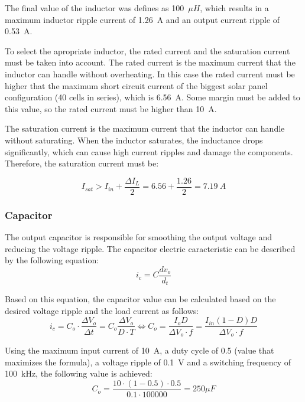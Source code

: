 The final value of the inductor was defines as 100~$\mu H$, which results in a maximum inductor ripple current of 1.26~A and an output current ripple of 0.53~A.

To select the apropriate inductor, the rated current and the saturation current must be taken into account. The rated current is the maximum current that the inductor can handle without overheating. In this case the rated current must be higher that the maximum short circuit current of the biggest solar panel configuration (40 cells in series), which is 6.56~A. Some margin must be added to this value, so the rated current must be higher than 10~A.

The saturation current is the maximum current that the inductor can handle without saturating. When the inductor saturates, the inductance drops significantly, which can cause high current ripples and damage the components. Therefore, the saturation current must be:

\begin{equation}
    I_{sat} > I_{in} + \frac{\Delta I_L}{2} = 6.56 + \frac{1.26}{2} = 7.19~A
\end{equation}

\subsubsection{Capacitor}
    The output capacitor is responsible for smoothing the output voltage and reducing the voltage ripple. The capacitor electric caracteristic can be described by the following equation:
    \begin{equation}
        i_c = C \frac{dv_o}{d_t}
    \end{equation}

    Based on this equation, the capacitor value can be calculated based on the desired voltage ripple and the load current as follows:
    \begin{equation}
        i_c = C_o \cdot \frac{\Delta V_o}{\Delta t} = C_o \frac{\Delta V_o}{D \cdot T } \Leftrightarrow C_o = \frac{I_o D}{\Delta V_o \cdot f} = \frac{I_{in} (1-D)D}{\Delta V_o \cdot f}
    \end{equation}

    Using the maximum input current of 10~A, a duty cycle of 0.5 (value that maximizes the formula), a voltage ripple of 0.1~V and a switching frequency of 100~kHz, the following value is achieved:
    \begin{equation}
        C_o = \frac{10 \cdot (1-0.5) \cdot 0.5}{0.1 \cdot 100000} = 250 \mu F
    \end{equation}

